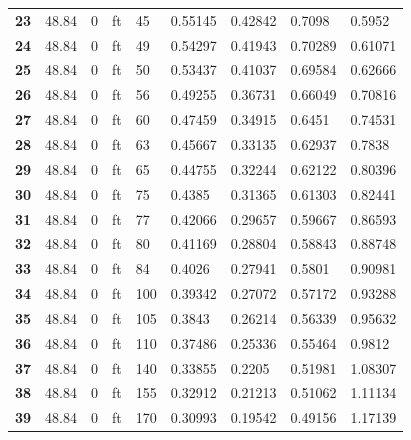 \documentclass{elegantbook}
\begin{document}
\begin{solution}
\begin{enumerate}[(a)]
\begin{footnotesize}
\begin{longtable}[c]{lllllllll}
                \textbf{23} & 48.84 & 0 & ft & 45  & 0.55145 & 0.42842 & 0.7098  & 0.5952  \\
                \textbf{24} & 48.84 & 0 & ft & 49  & 0.54297 & 0.41943 & 0.70289 & 0.61071 \\
                \textbf{25} & 48.84 & 0 & ft & 50  & 0.53437 & 0.41037 & 0.69584 & 0.62666 \\
                \textbf{26} & 48.84 & 0 & ft & 56  & 0.49255 & 0.36731 & 0.66049 & 0.70816 \\
                \textbf{27} & 48.84 & 0 & ft & 60  & 0.47459 & 0.34915 & 0.6451  & 0.74531 \\
                \textbf{28} & 48.84 & 0 & ft & 63  & 0.45667 & 0.33135 & 0.62937 & 0.7838  \\
                \textbf{29} & 48.84 & 0 & ft & 65  & 0.44755 & 0.32244 & 0.62122 & 0.80396 \\
                \textbf{30} & 48.84 & 0 & ft & 75  & 0.4385  & 0.31365 & 0.61303 & 0.82441 \\
                \textbf{31} & 48.84 & 0 & ft & 77  & 0.42066 & 0.29657 & 0.59667 & 0.86593 \\
                \textbf{32} & 48.84 & 0 & ft & 80  & 0.41169 & 0.28804 & 0.58843 & 0.88748 \\
                \textbf{33} & 48.84 & 0 & ft & 84  & 0.4026  & 0.27941 & 0.5801  & 0.90981 \\
                \textbf{34} & 48.84 & 0 & ft & 100 & 0.39342 & 0.27072 & 0.57172 & 0.93288 \\
                \textbf{35} & 48.84 & 0 & ft & 105 & 0.3843  & 0.26214 & 0.56339 & 0.95632 \\
                \textbf{36} & 48.84 & 0 & ft & 110 & 0.37486 & 0.25336 & 0.55464 & 0.9812  \\
                \textbf{37} & 48.84 & 0 & ft & 140 & 0.33855 & 0.2205  & 0.51981 & 1.08307 \\
                \textbf{38} & 48.84 & 0 & ft & 155 & 0.32912 & 0.21213 & 0.51062 & 1.11134 \\
                \textbf{39} & 48.84 & 0 & ft & 170 & 0.30993 & 0.19542 & 0.49156 & 1.17139 \\ \hline
                \end{longtable}
        \end{footnotesize}
        

\end{enumerate}
\end{solution}
\end{document}
